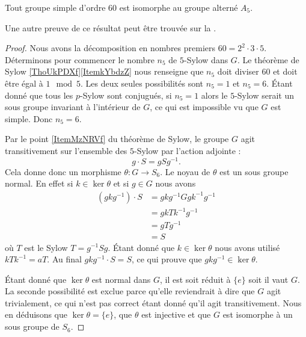 \begin{proposition}
    Tout groupe simple d'ordre \( 60\) est isomorphe au groupe alterné \( A_5\).
\end{proposition}
Une autre preuve de ce résultat peut être trouvée sur la . 

\begin{proof}
    Nous avons la décomposition en nombres premiers \( 60=2^2\cdot 3\cdot 5\). Déterminons pour commencer le nombre \( n_5\) de \( 5\)-Sylow dans \( G\). Le théorème de Sylow \ref{ThoUkPDXf}\ref{ItemkYbdzZ} nous renseigne que \( n_5\) doit diviser \( 60\) et doit être égal à \( 1\mod 5\). Les deux seules possibilités sont \( n_5=1\) et \( n_5=6\). Étant donné que tous les \( p\)-Sylow sont conjugués, si \( n_5=1\) alors le \( 5\)-Sylow serait un sous groupe invariant à l'intérieur de $G$, ce qui est impossible vu que \( G\) est simple. Donc \( n_5=6\).

    Par le point \ref{ItemMzNRVf} du théorème de Sylow, le groupe \( G\) agit transitivement sur l'ensemble des \( 5\)-Sylow par l'action adjointe :
    \begin{equation}
        g\cdot S=gSg^{-1}.
    \end{equation}
    Cela donne donc un morphisme \( \theta\colon G\to S_6\). Le noyau de \( \theta\) est un sous groupe normal. En effet si \( k\in \ker\theta\) et si \( g\in G\) nous avons
    \begin{subequations}
        \begin{align}
            (gkg^{-1})\cdot S&=gkg^{-1} Ggk^{-1}g^{-1}\\
            &=gkTk^{-1}g^{-1}\\
            &=gTg^{-1}\\
            &=S
        \end{align}
    \end{subequations}
    où \( T\) est le Sylow \( T=g^{-1}Sg\). Étant donné que \( k\in \ker\theta\) nous avons utilisé \( kTk^{-1}=aT\). Au final \( gkg^{-1}\cdot S=S\), ce qui prouve que \( gkg^{-1} \in\ker\theta\).

    Étant donné que \( \ker\theta\) est normal dans \( G\), il est soit réduit à \( \{ e \}\) soit il vaut \( G\). La seconde possibilité est exclue parce qu'elle reviendrait à dire que \( G\) agit trivialement, ce qui n'est pas correct étant donné qu'il agit transitivement. Nous en déduisons que \( \ker\theta=\{ e \}\), que \( \theta\) est injective et que \( G\) est isomorphe à un sous groupe de \( S_6\).


\end{proof}
